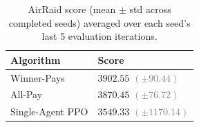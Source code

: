 \begin{table}
  \centering
  \caption{AirRaid score (mean $\pm$ std across completed seeds) averaged over each seed's last 5 evaluation iterations.}
  \begin{tabular}{ll}
    \hline
    {\bf Algorithm} & {\bf Score} \\
    \hline
    Winner-Pays & $3902.55$ {\small\textcolor{gray}{$(\pm 90.44)$}} \\
    All-Pay & $3870.45$ {\small\textcolor{gray}{$(\pm 76.72)$}} \\
    Single-Agent PPO & $3549.33$ {\small\textcolor{gray}{$(\pm 1170.14)$}} \\
    \hline
  \end{tabular}
  \label{tab:airraid_methods}
\end{table}
